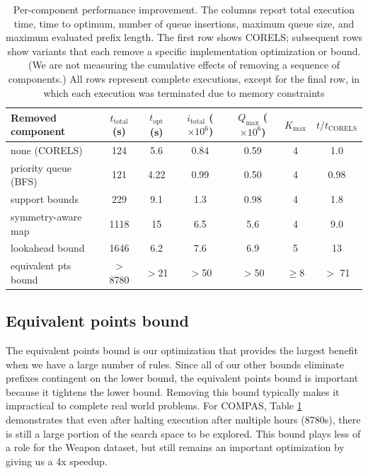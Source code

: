 \begin{table}[t!]
\begin{adjustwidth}{-.4in}{-.4in}
\begin{tabular}{l | c | c | c | c | c | c} 
  Removed component & $t_\text{total}$ (s) & $t_\text{opt}$ (s) & $i_\text{total}$ ($\times 10^6$) & $Q_\text{max}$ ($\times 10^6$) & $K_\text{max}$ & $t/t_\text{CORELS}$ \\
\hline
none (CORELS) & 124 & 5.6 & 0.84 & 0.59 & 4 & 1.0 \\
priority queue (BFS) & 121 & 4.22 & 0.99 & 0.50 & 4 & 0.98 \\
support bounds & 229 & 9.1 & 1.3 & 0.98 & 4 & 1.8 \\
symmetry-aware map & 1118 & 15 & 6.5 & 5.6 & 4 & 9.0\\
lookahead bound & 1646 & 6.2 & 7.6 & 6.9 & 5 & 13 \\
equivalent pts bound & $>$8780 & $>$21 & $>$50 & $>$50 & $\ge$8 & $>$ 71
\end{tabular}
\vspace{3mm}
\caption{Per-component performance improvement.
%
The columns report total execution time,
time to optimum, number of queue insertions,
maximum queue size, and maximum evaluated prefix length.
%
The first row shows CORELS; subsequent rows show variants
that each remove a specific implementation optimization or bound.
%
(We are not measuring the cumulative effects of removing a sequence of components.)
%
All rows represent complete executions, except for the final row,
in which each execution was terminated due to memory constraints
}
\label{tab:compas}
\end{adjustwidth}
\end{table}

\subsection{Equivalent points bound}
\label{exp:ablation-equiv}
The equivalent points bound is our optimization that provides the largest benefit when we have a large number of rules.
Since all of our other bounds eliminate prefixes contingent on the lower bound, the equivalent points bound is important because it tightens the lower bound.
Removing this bound typically makes it impractical to complete real world problems.
For COMPAS, Table \ref{tab:compas} demonstrates that even after halting execution after multiple hours (8780s), there is still a large portion of the search space to be explored.
This bound plays less of a role for the Weapon dataset, but still remains an important optimization by giving us a 4x speedup.

